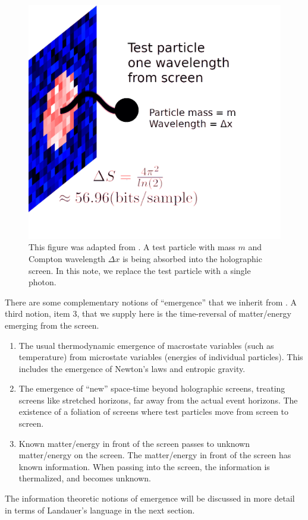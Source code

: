 \documentclass[12pt,a4paper]{article}
\begin{document}
\begin{figure}[h]
\centering
\includegraphics[scale=0.2]{bits_on_screen.png}
\caption{This figure was adapted from \cite{entropic}.  A test particle with mass $m$ and Compton wavelength $\Delta x$ is being absorbed into the holographic screen.  In this note, we replace the test particle with a single photon.}
\label{fig:x cubed graph}
\end{figure}
There are some complementary notions of ``emergence'' that we inherit from \cite{entropic}.  A third notion, item 3, that we supply here is the time-reversal of matter/energy emerging from the screen.
\begin{enumerate}
  \item The usual thermodynamic emergence of macrostate variables (such as temperature) from microstate variables (energies of individual particles).  This includes the emergence of Newton's laws and entropic gravity.
  \item The emergence of ``new'' space-time beyond holographic screens, treating screens like stretched horizons, far away from the actual event horizons.  The existence of a foliation of screens where test particles move from screen to screen.
  \item Known matter/energy in front of the screen passes to unknown matter/energy on the screen. The matter/energy in front of the screen has known information.  When passing into the screen, the information is thermalized, and becomes unknown.
\end{enumerate}
The information theoretic notions of emergence will be discussed in more detail in terms of Landauer's language in the next section.
\end{document}
